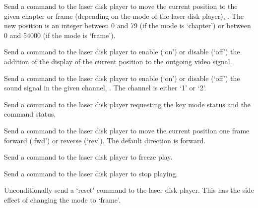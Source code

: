   Send a command to the laser disk player to move the current position to the given chapter or frame
  (depending on the mode of the laser disk player), .
  The new position is an integer between 0 and 79 (if the mode is `chapter') or between 0 and
  54000 (if the mode is `frame').
  
  Send a command to the laser disk player to enable (`on') or disable (`off') the addition of the
  display of the current position to the outgoing video signal.
  
  Send a command to the laser disk player to enable (`on') or disable (`off') the sound signal in
  the given channel, .
  The channel is either `1' or `2'.
  
  Send a command to the laser disk player requesting the key mode status and the command status.
  
  Send a command to the laser disk player to move the current position one frame forward (`fwd') or
  reverse (`rev').
  The default direction is forward.
  
  Send a command to the laser disk player to freeze play.
  
  Send a command to the laser disk player to stop playing.
  
  Unconditionally send a `reset' command to the laser disk player.
  This has the side effect of changing the mode to `frame'.
  
  \objListCmdEnd

\objItemFile

\objItemMessage




%
%
